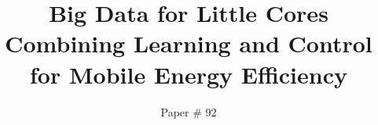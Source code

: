 \documentclass[pageno]{jpaper}
\begin{document}
\title{Big Data for Little Cores \\ {\large Combining Learning and Control for
  Mobile Energy Efficiency}} \author{Paper \# 92} \date{}

\maketitle
\thispagestyle{empty}







\newpage
\clearpage
 


\end{document}
